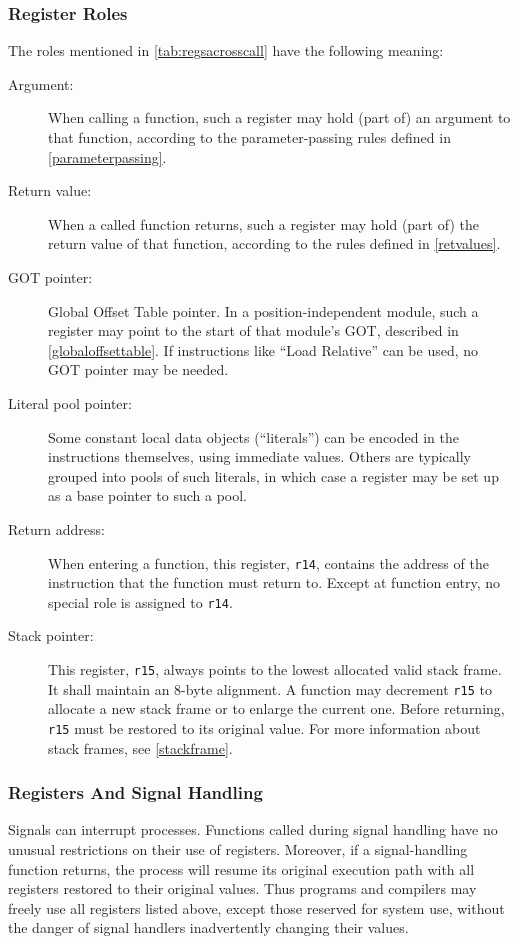 \documentclass[english,11pt,twoside,toc=bib,toc=idx]{scrreprt}
\begin{document}
\subsubsection{Register Roles}
The roles mentioned in \cref{tab:regsacrosscall}
have the following meaning:
\begin{description}
\item[Argument:]  When calling a function, such a
  register may hold {\ifzseries\else (part of) \fi}%
  an argument to that function, according to the parameter-passing rules
  defined in \cref{parameterpassing}.
\item[Return value:]  When a called function
  returns, such a register may hold {\ifzseries\else (part of)\fi}%
  the return value of that function, according to the rules defined in
  \cref{retvalues}.
\item[GOT pointer:]  Global Offset Table pointer.  In a
  position-independent module, such a register may point to the start of
  that module's GOT, described in \cref{globaloffsettable}.  If
  instructions like ``Load Relative'' can be used, no GOT pointer may be
  needed.
\item[Literal pool pointer:]  Some constant
  local data objects (``literals'') can be encoded in the instructions
  themselves, using immediate values.  Others are typically grouped into
  pools of such literals, in which case a register may be set up as a base
  pointer to such a pool.
\item[Return address:]  When entering a
  function, this register, \texttt{r14}, contains the address of the
  instruction that the function must return to.  Except at function entry,
  no special role is assigned to \texttt{r14}.
\item[Stack pointer:]  This register, \texttt{r15},
  always points to the lowest allocated valid stack frame.  It shall
  maintain an 8-byte alignment.  A function may decrement \texttt{r15} to
  allocate a new stack frame or to enlarge the current one.  Before
  returning, \texttt{r15} must be restored to its original value.  For
  more information about stack frames, see \cref{stackframe}.
\end{description}

\subsubsection{Registers And Signal Handling}
Signals can interrupt processes.  Functions called during signal
handling have no unusual restrictions on their use of registers.
Moreover, if a signal-handling function returns, the process will
resume its original execution path with all registers restored to
their original values.  Thus programs and compilers may freely use all
registers listed above, except those reserved for system use, without
the danger of signal handlers inadvertently changing their values.
\end{document}
